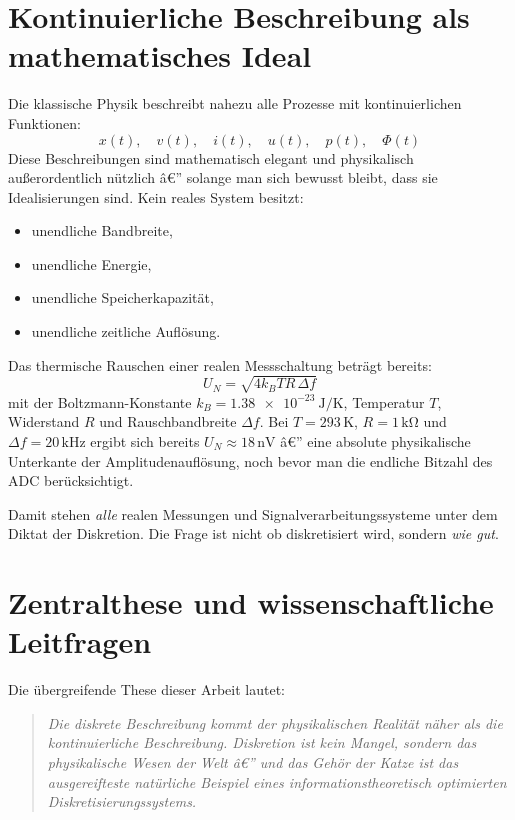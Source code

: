 ﻿\documentclass[12pt,a4paper,titlepage]{report}
\begin{document}
\section{Kontinuierliche Beschreibung als mathematisches Ideal}

Die klassische Physik beschreibt nahezu alle Prozesse mit kontinuierlichen
Funktionen:
\[
	x(t), \quad v(t), \quad i(t), \quad u(t), \quad p(t), \quad \Phi(t)
\]
Diese Beschreibungen sind mathematisch elegant und physikalisch außerordentlich
nützlich â€” solange man sich bewusst bleibt, dass sie Idealisierungen sind.
Kein reales System besitzt:

\begin{itemize}[leftmargin=2em]
	\item unendliche Bandbreite,
	\item unendliche Energie,
	\item unendliche Speicherkapazität,
	\item unendliche zeitliche Auflösung.
\end{itemize}

Das thermische Rauschen einer realen Messschaltung beträgt bereits:
\[
	U_N = \sqrt{4 k_B T R \,\Delta f}
\]
mit der Boltzmann-Konstante
$k_B = \SI{1.38e-23}{\joule\per\kelvin}$,
Temperatur $T$, Widerstand $R$ und Rauschbandbreite $\Delta f$.
Bei $T=293\,\mathrm{K}$, $R=1\,\mathrm{k\Omega}$ und $\Delta f=20\,\mathrm{kHz}$
ergibt sich bereits $U_N \approx 18\,\mathrm{nV}$ â€”
eine absolute physikalische Unterkante der Amplitudenauflösung,
noch bevor man die endliche Bitzahl des ADC berücksichtigt.

Damit stehen \emph{alle} realen Messungen und Signalverarbeitungssysteme
unter dem Diktat der Diskretion.
Die Frage ist nicht ob diskretisiert wird, sondern \emph{wie gut}.

\section{Zentralthese und wissenschaftliche Leitfragen}

Die übergreifende These dieser Arbeit lautet:

\begin{quote}
	\itshape
	Die diskrete Beschreibung kommt der physikalischen Realität näher
	als die kontinuierliche Beschreibung.
	Diskretion ist kein Mangel, sondern das physikalische Wesen der Welt â€”
	und das Gehör der Katze ist das ausgereifteste natürliche Beispiel
	eines informationstheoretisch optimierten Diskretisierungssystems.
\end{quote}
\end{document}
